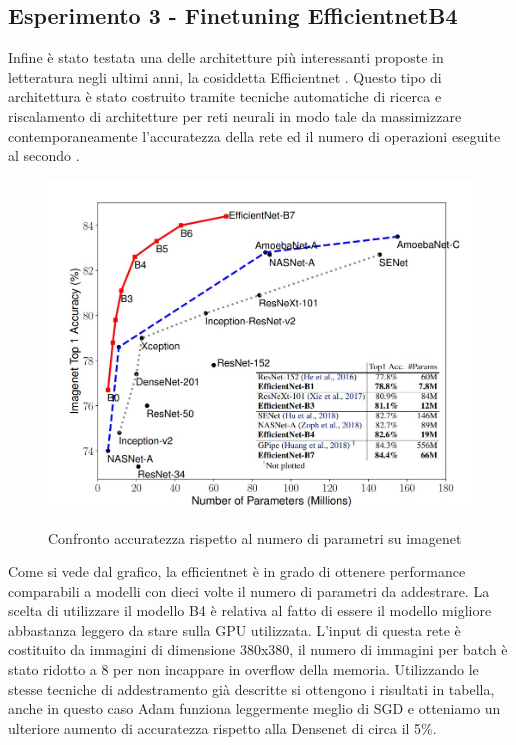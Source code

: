 \subsection{Esperimento 3 - Finetuning EfficientnetB4}
Infine è stato testata una delle architetture più interessanti proposte in letteratura negli ultimi anni, la cosiddetta Efficientnet \cite{tan2019efficientnet}.
Questo tipo di architettura è stato costruito tramite tecniche automatiche di ricerca e riscalamento di architetture per reti neurali in modo tale da massimizzare contemporaneamente l'accuratezza della rete ed il numero di operazioni eseguite al secondo .
\begin{figure}[ht]
\centering
\includegraphics[width=1.0\textwidth]{images/efficientnet} 
\label{i_efficientnet}
\caption{Confronto accuratezza rispetto al numero di parametri su imagenet}
\end{figure}

Come si vede dal grafico, la efficientnet è in grado di ottenere performance comparabili a modelli con dieci volte il numero di parametri da addestrare. La scelta di utilizzare il modello B4 è relativa al fatto di essere il modello migliore abbastanza leggero da stare sulla GPU utilizzata.
L'input di questa rete è costituito da immagini di dimensione 380x380, il numero di immagini per batch è stato ridotto a 8 per non incappare in overflow della memoria.
Utilizzando le stesse tecniche di addestramento già descritte si ottengono i risultati in tabella, anche in questo caso Adam funziona leggermente meglio di SGD e otteniamo un ulteriore aumento di accuratezza rispetto alla Densenet di circa il 5\%.
